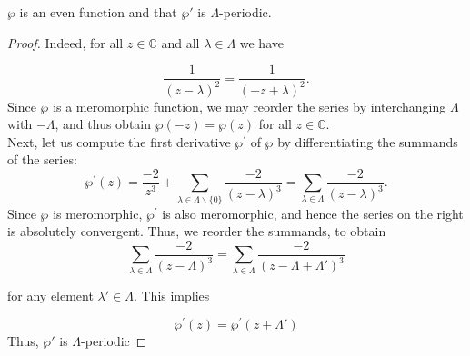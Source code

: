 \begin{proposition}\label{B}
$\wp$ is an even function and that $\wp'$ is $\Lambda$-periodic. 


   \begin{proof}
Indeed, for all $z \in \mathbb{C}$ and all $\lambda \in \Lambda$ we have

$$
\frac{1}{(z-\lambda)^{2}}=\frac{1}{(-z+\lambda)^{2}} .
$$
Since $\wp$ is a meromorphic function, we may reorder the series by interchanging $\Lambda$ with $-\Lambda$, and thus obtain $\wp(-z)=\wp(z)$ for all $z \in \mathbb{C}$. \\
Next,  let us compute the first derivative $\wp^{\prime}$ of $\wp$ by differentiating the summands of the series:
$$
\wp^{\prime}(z)=\frac{-2}{z^{3}}+\sum_{\lambda \in \Lambda \backslash\{0\}} \frac{-2}{(z-\lambda)^{3}}=\sum_{\lambda \in \Lambda} \frac{-2}{(z-\lambda)^{3}} .
$$
Since $\wp$ is meromorphic, $\wp^{\prime}$ is also meromorphic, and hence the series on the right is absolutely convergent. 
Thus, we reorder the summands, to obtain
$$
\sum_{\lambda \in \Lambda} \frac{-2}{(z-\Lambda)^{3}}=\sum_{\lambda \in \Lambda} \frac{-2}{\left(z-\Lambda+\Lambda'\right)^{3}}
$$

for any element $\lambda' \in \Lambda$. This implies

$$
\wp^{\prime}(z)=\wp^{\prime}\left(z+\Lambda'\right)
$$
Thus, $\wp'$ is $\Lambda$-periodic

   \end{proof}
\end{proposition}

